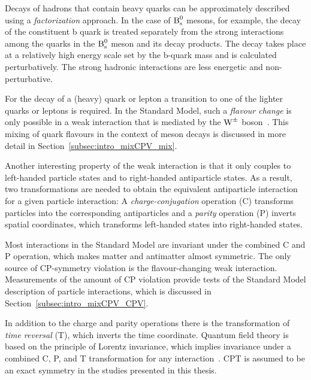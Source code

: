 Decays of hadrons that contain heavy quarks can be approximately described using a \emph{factorization} approach. In the case of $\Bs$
mesons, for example, the decay of the constituent b quark is treated separately from the strong interactions among the quarks in the $\Bs$
meson and its decay products. The decay takes place at a relatively high energy scale set by the b-quark mass and is calculated
perturbatively. The strong hadronic interactions are less energetic and non-perturbative.

For the decay of a (heavy) quark or lepton a transition to one of the lighter quarks or leptons is required. In the Standard Model, such a
\emph{flavour change} is only possible in a weak interaction that is mediated by the $\Wpm$
boson~\cite{Cabibbo:1963yz,Glashow:1970gm,Kobayashi:1973fv}. This mixing of quark flavours in the context of meson decays is discussed in
more detail in Section~\ref{subsec:intro_mixCPV_mix}.


Another interesting property of the weak interaction is that it only couples to left-handed particle states and to right-handed
antiparticle states. As a result, two transformations are needed to obtain the equivalent antiparticle interaction for a given particle
interaction: A \emph{charge-conjugation} operation (C) transforms particles into the corresponding antiparticles and a \emph{parity}
operation (P) inverts spatial coordinates, which transforms left-handed states into right-handed states.

Most interactions in the Standard Model are invariant under the combined C and P operation, which makes matter and antimatter almost
symmetric. The only source of CP-symmetry violation is the flavour-changing weak interaction. Measurements of the amount of CP violation
provide tests of the Standard Model description of particle interactions, which is discussed in Section~\ref{subsec:intro_mixCPV_CPV}.

In addition to the charge and parity operations there is the transformation of \emph{time reversal} (T), which inverts the time coordinate.
Quantum field theory is based on the principle of Lorentz invariance, which implies invariance under a combined C, P, and T transformation
for any interaction~\cite{Greenberg:2002uu}. CPT is assumed to be an exact symmetry in the studies presented in this thesis.


